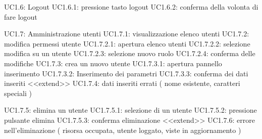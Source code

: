 UC1.6: Logout
UC1.6.1: pressione tasto logout
UC1.6.2: conferma della volonta di fare logout

UC1.7: Amministrazione utenti
UC1.7.1: visualizzazione elenco utenti
UC1.7.2: modifica permessi utente
UC1.7.2.1: apertura elenco utenti
UC1.7.2.2: selezione modifica su un utente
UC1.7.2.3: selezione nuovo ruolo
UC1.7.2.4: conferma delle modifiche
UC1.7.3: crea un nuovo utente
UC1.7.3.1: apertura pannello inserimento
UC1.7.3.2: Inserimento dei parametri
UC1.7.3.3: conferma dei dati inseriti
<<extend>>
UC1.7.4: dati inseriti errati
( nome esistente, caratteri speciali )

UC1.7.5: elimina un utente
UC1.7.5.1: selezione di un utente
UC1.7.5.2: pressione pulsante elimina
UC1.7.5.3: conferma eliminazione
<<extend>> 
UC1.7.6: errore nell’eliminazione
( risorsa occupata, utente loggato, viste in aggiornamento )





